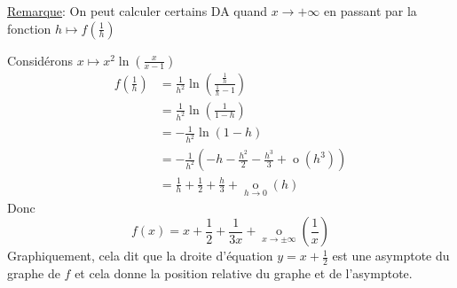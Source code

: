 \documentclass[10pt,a4paper]{article}
\theoremstyle{definition}
\DeclareMathOperator*{\negl}{o}
\begin{document}
\uline{Remarque}: On peut calculer certains DA quand $x \to +\infty$ en passant par la fonction $h \mapsto f(\frac{1}{h})$ \medskip

Considérons $x \mapsto x^2 \ln(\frac{x}{x - 1})$
\begin{align*}
f(\frac{1}{h}) &= \frac{1}{h^2} \ln\left(\frac{\frac{1}{h}}{\frac{1}{h} - 1}\right) \\
&= \frac{1}{h^2} \ln\left(\frac{1}{1 - h}\right) \\
&= -\frac{1}{h^2} \ln(1 - h) \\
&= -\frac{1}{h^2} \left(-h -\frac{h^2}{2} - \frac{h^3}{3} + \negl(h^3)\right) \\
&= \frac{1}{h} + \frac{1}{2} + \frac{h}{3} + \negl\limits_{h \to 0}(h)
\end{align*}
Donc
\[f(x) = x + \frac{1}{2} + \frac{1}{3x} + \negl\limits_{x \to \pm\infty}\left(\frac{1}{x}\right)\]
Graphiquement, cela dit que la droite d'équation $y = x + \frac{1}{2}$ est une asymptote du graphe de $f$ et cela donne la position relative du graphe et de l'asymptote.
\end{document}
